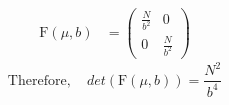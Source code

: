 \documentclass[wcp]{jmlr}
\begin{document}
\begin{align*}
  \mathrm{F}(\mu,b) &= \left( \begin{array}{cc}
        \frac{N}{b^2} & 0 \\
        0 & \frac{N}{b^2}
            \end{array} \right) 
\end{align*}
\begin{equation} \mathrm{Therefore,}\quad det(\mathrm{F}(\mu,b)) = \frac{N^2}{b^4} \label{eqn:laplace_fisher} \end{equation}
\end{document}
